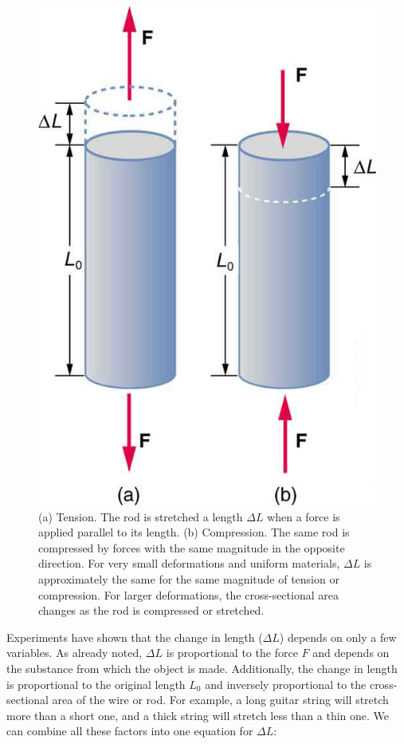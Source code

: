 \documentclass[
]{book}
\begin{document}
\begin{figure}
\hypertarget{import-auto-id1165298469619}{%
\centering
\includegraphics{images/Figure_06_03_03a.jpg}
\caption{(a) Tension. The rod is stretched a length \({\Delta L}{}\) when a force
is applied parallel to its length. (b) Compression. The same rod is
compressed by forces with the same magnitude in the opposite direction.
For very small deformations and uniform materials, \({\Delta L}{}\) is
approximately the same for the same magnitude of tension or compression.
For larger deformations, the cross-sectional area changes as the rod is
compressed or
stretched.}\label{import-auto-id1165298469619}
}
\end{figure}

Experiments have shown that the change in length (\({\Delta L}{}\))
depends on only a few variables. As already noted, \({\Delta L}{}\) is
proportional to the force \(F{}\) and depends on the substance from which
the object is made. Additionally, the change in length is proportional
to the original length \(L_{0}{}\) and inversely proportional to the
cross-sectional area of the wire or rod. For example, a long guitar
string will stretch more than a short one, and a thick string will
stretch less than a thin one. We can combine all these factors into one
equation for \({\Delta L}{}\):
\end{document}
